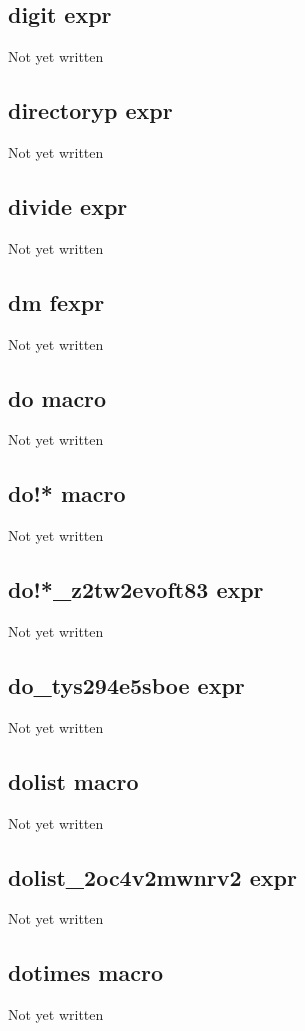 \documentclass[a4paper,11pt]{article}
\begin{document}
\subsection{\ttfamily digit expr}
Not yet written

\subsection{\ttfamily directoryp expr}
Not yet written

\subsection{\ttfamily divide expr}
Not yet written

\subsection{\ttfamily dm fexpr}
Not yet written

\subsection{\ttfamily do macro}
Not yet written

\subsection{\ttfamily do!* macro}
Not yet written

\subsection{\ttfamily do!*\_z2tw2evoft83 expr}
Not yet written

\subsection{\ttfamily do\_tys294e5sboe expr}
Not yet written

\subsection{\ttfamily dolist macro}
Not yet written

\subsection{\ttfamily dolist\_2oc4v2mwnrv2 expr}
Not yet written

\subsection{\ttfamily dotimes macro}
Not yet written
\end{document}
